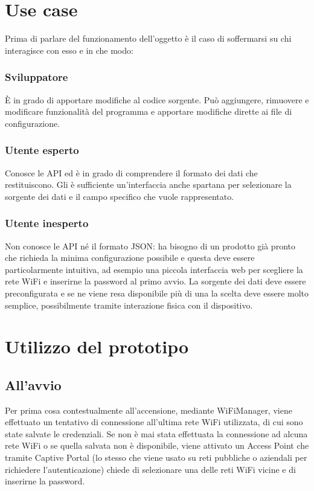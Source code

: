 \documentclass[12pt,a4paper]{report}
\begin{document}
\chapter{Use case}
Prima di parlare del funzionamento dell'oggetto è il caso di soffermarsi su chi interagisce con esso e in che modo:  %
\subsection*{Sviluppatore}
È in grado di apportare modifiche al codice sorgente. Può aggiungere, rimuovere e  modificare funzionalità del programma
e apportare modifiche dirette ai file di configurazione.
\subsection*{Utente esperto}
Conosce le API ed è in grado di comprendere il formato dei dati che restituiscono. Gli è sufficiente un'interfaccia anche spartana
per selezionare la sorgente dei dati e il campo specifico che vuole rappresentato.
\subsection*{Utente inesperto}
Non conosce le API né il formato JSON: ha bisogno di un prodotto già pronto che richieda la minima configurazione possibile e questa
deve essere particolarmente intuitiva, ad esempio una piccola interfaccia web per scegliere la rete WiFi e inserirne la password
al primo avvio. La sorgente dei dati deve essere preconfigurata e se ne viene resa disponibile più di una la scelta deve essere molto
semplice, possibilmente tramite interazione fisica con il dispositivo.



\chapter{Utilizzo del prototipo}

\section{All'avvio}
Per prima cosa contestualmente all'accensione, mediante WiFiManager, viene effettuato un tentativo di connessione all'ultima rete WiFi
utilizzata, di cui sono state salvate le credenziali. Se non è mai stata effettuata la connessione ad alcuna rete WiFi o se
quella salvata non è disponibile, viene attivato un Access Point che tramite Captive Portal (lo stesso che viene usato su reti pubbliche
o aziendali per richiedere l'autenticazione) chiede di selezionare una delle reti WiFi vicine e di inserirne la password.\\
\end{document}
